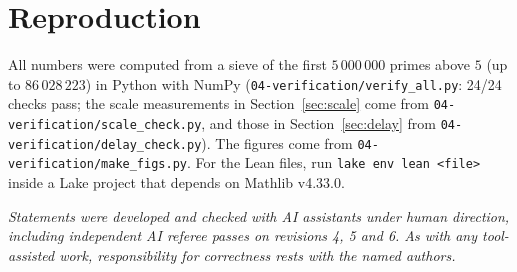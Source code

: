 \documentclass[11pt]{article}
\theoremstyle{plain}
\theoremstyle{definition}
\theoremstyle{remark}
\begin{document}
\section*{Reproduction}

All numbers were computed from a sieve of the first $5\,000\,000$ primes above $5$ (up to
$86\,028\,223$) in Python with NumPy (\texttt{04-verification/verify\_all.py}: 24/24 checks pass; the scale measurements in
Section~\ref{sec:scale} come from \texttt{04-verification/scale\_check.py}, and those in
Section~\ref{sec:delay} from \texttt{04-verification/delay\_check.py}).
The figures come from \texttt{04-verification/make\_figs.py}. For the Lean files, run
\texttt{lake env lean <file>} inside a Lake project that depends on Mathlib v4.33.0.

\vspace{1em}
\noindent\emph{Statements were developed and checked with AI assistants under human direction,
including independent AI referee passes on revisions 4, 5 and 6. As with any tool-assisted work,
responsibility for correctness rests with the named authors.}
\end{document}
